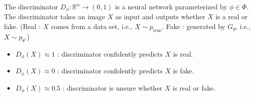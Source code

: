\begin{definition}
    The discriminator $D_{\phi}: \mathbb{R}^{n} \rightarrow(0,1)$ is a neural network parameterized by $\phi \in \Phi$. The discriminator takes an image $X$ as input and outputs whether $X$ is a real or fake.
    (Real : $X$ comes from a data set, i.e., $X \sim p_{\text{true}}$. Fake : generated by $G_{\theta}$, i.e., $X \sim p_{\theta}$.)

    \begin{itemize}
        \item $D_{\phi}(X) \approx 1$ : discriminator confidently predicts $X$ is real.
        \item $D_{\phi}(X) \approx 0$ : discriminator confidently predicts $X$ is fake.
        \item $D_{\phi}(X) \approx 0.5$ : discriminator is unsure whether $X$ is real or fake.
    \end{itemize}
\end{definition}

